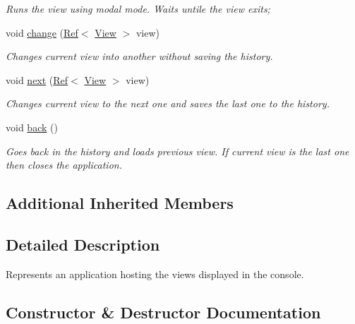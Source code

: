 \begin{DoxyCompactItemize}
\begin{DoxyCompactList}\small\item\em Runs the view using modal mode. Waits untile the view exits; \end{DoxyCompactList}\item 
void \mbox{\hyperlink{class_application_adc075972df579dbdbe46013da51ed70c}{change}} (\mbox{\hyperlink{class_ref}{Ref}}$<$ \mbox{\hyperlink{class_view}{View}} $>$ view)
\begin{DoxyCompactList}\small\item\em Changes current view into another without saving the history. \end{DoxyCompactList}\item 
void \mbox{\hyperlink{class_application_a95a10ebbce931b4c58116c492ab163be}{next}} (\mbox{\hyperlink{class_ref}{Ref}}$<$ \mbox{\hyperlink{class_view}{View}} $>$ view)
\begin{DoxyCompactList}\small\item\em Changes current view to the next one and saves the last one to the history. \end{DoxyCompactList}\item 
void \mbox{\hyperlink{class_application_a7efbd7aad2bb4539e23d11b1f9dea252}{back}} ()
\begin{DoxyCompactList}\small\item\em Goes back in the history and loads previous view. If current view is the last one then closes the application. \end{DoxyCompactList}\end{DoxyCompactItemize}
\subsection*{Additional Inherited Members}


\subsection{Detailed Description}
Represents an application hosting the views displayed in the console. 



\subsection{Constructor \& Destructor Documentation}
\mbox{\label{class_application_afa8cc05ce6b6092be5ecdfdae44e05f8}} 

